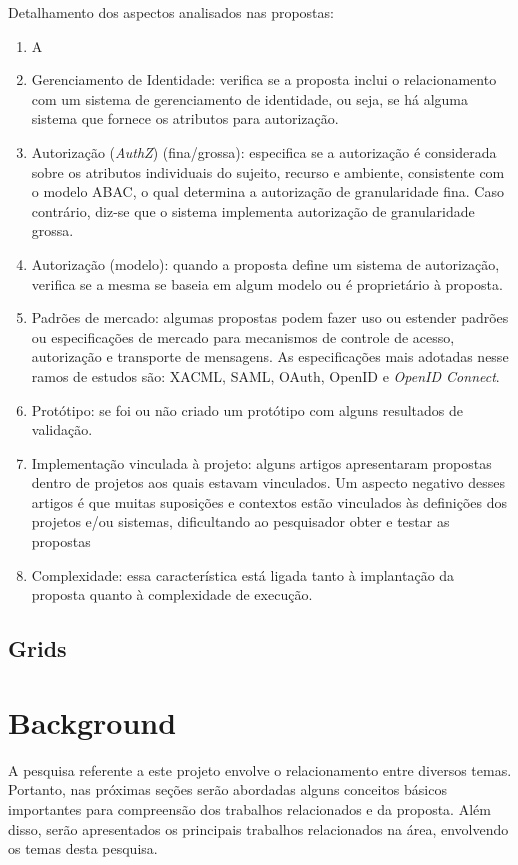 \documentclass{doublecol-new}
\begin{document}
Detalhamento dos aspectos analisados nas propostas:
\begin{enumerate}
	\item A
	\item Gerenciamento de Identidade: verifica se a proposta inclui o relacionamento com um sistema de gerenciamento de identidade, ou seja, se há alguma sistema que fornece os atributos para autorização.
	\item Autorização (\textit{AuthZ}) (fina/grossa): especifica se a autorização é considerada sobre os atributos individuais do sujeito, recurso e ambiente, consistente com o modelo ABAC, o qual determina a autorização de granularidade fina. Caso contrário, diz-se que o sistema implementa autorização de granularidade grossa.
	\item Autorização (modelo): quando a proposta define um sistema de autorização, verifica se a mesma se baseia em algum modelo ou é proprietário à proposta.
	\item Padrões de mercado: algumas propostas podem fazer uso ou estender padrões ou especificações de mercado para mecanismos de controle de acesso, autorização e transporte de mensagens. As especificações mais adotadas nesse ramos de estudos são: XACML, SAML, OAuth, OpenID e \textit{OpenID Connect}.
	\item Protótipo: se foi ou não criado um protótipo com alguns resultados de validação.
	\item Implementação vinculada à projeto: alguns artigos apresentaram propostas dentro de projetos aos quais estavam vinculados. Um aspecto negativo desses artigos é que muitas suposições e contextos estão vinculados às definições dos projetos e/ou sistemas, dificultando ao pesquisador obter e testar as propostas
	\item Complexidade: essa característica está ligada tanto à implantação da proposta quanto à complexidade de execução.
\end{enumerate}


\subsection{Grids}

\section{Background}
A pesquisa referente a este projeto envolve o relacionamento entre diversos temas. Portanto, nas próximas seções serão abordadas alguns conceitos básicos importantes para compreensão dos trabalhos relacionados e da proposta. Além disso, serão apresentados os principais trabalhos relacionados na área, envolvendo os temas desta pesquisa. 
\end{document}
